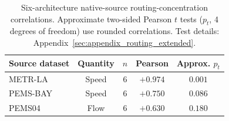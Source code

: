 \begin{table}[h]
\centering\small
\caption{Six-architecture native-source routing-concentration correlations. Approximate two-sided Pearson $t$ tests ($p_t$, 4 degrees of freedom) use rounded correlations. Test details: Appendix~\ref{sec:appendix_routing_extended}.}
\label{tab:routing_extended}
\begin{tabular}{lcccc}
\toprule
\textbf{Source dataset} & \textbf{Quantity} & \textbf{$n$} & \textbf{Pearson} & \textbf{Approx. $p_t$} \\
\midrule
METR-LA & Speed & 6 & $+0.974$ & $0.001$ \\
PEMS-BAY & Speed & 6 & $+0.750$ & $0.086$ \\
PEMS04 & Flow & 6 & $+0.630$ & $0.180$ \\
\bottomrule
\end{tabular}
\end{table}
